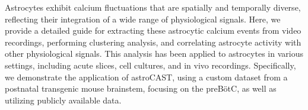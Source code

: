 Astrocytes exhibit calcium fluctuations that are spatially and temporally diverse, reflecting their integration of a wide range of physiological signals\citep{semyanov_making_2020,smedler_frequency_2014}. Here, we provide a detailed guide for extracting these astrocytic calcium events from video recordings, performing clustering analysis, and correlating astrocyte activity with other physiological signals. This analysis has been applied to astrocytes in various settings, including acute slices, cell cultures, and in vivo recordings. Specifically, we demonstrate the application of astroCAST, using a custom dataset from a postnatal transgenic mouse brainstem, focusing on the \ac{preBötC}, as well as utilizing publicly available data.
